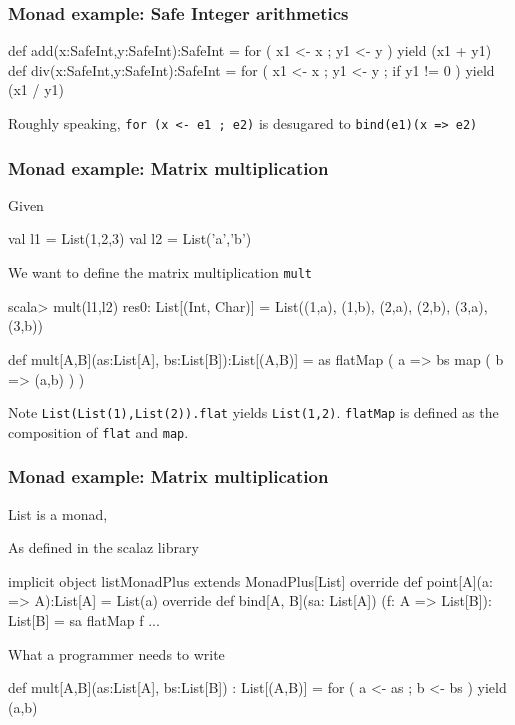 \documentclass{beamer}
\newcommand{\beb}{\begin{exampleblock}}
\newcommand{\eeb}{\end{exampleblock}}
\begin{document}
\begin{frame}[fragile]
\frametitle{Monad example: Safe Integer arithmetics}
\beb{}
\begin{code}
def add(x:SafeInt,y:SafeInt):SafeInt = {
  for ( x1 <- x
  ; y1 <- y
  ) yield (x1 + y1)
}
def div(x:SafeInt,y:SafeInt):SafeInt = {
  for ( x1 <- x
  ; y1 <- y
  ; if y1 != 0
  ) yield (x1 / y1)
}
\end{code}
\eeb{}
Roughly speaking, {\tt for (x <- e1 ; e2)} is desugared to 
{\tt bind(e1)(x => e2)}
\end{frame}



\begin{frame}[fragile]
\frametitle{Monad example: Matrix multiplication}
Given
\beb{}
\begin{code}
val l1 = List(1,2,3)
val l2 = List('a','b')
\end{code}
\eeb
We want to define the matrix multiplication {\tt mult} 
\begin{code}
scala> mult(l1,l2)
res0: List[(Int, Char)] = List((1,a), (1,b), (2,a), (2,b),
 (3,a),(3,b))
\end{code}
\beb{}
\begin{code}
def mult[A,B](as:List[A], bs:List[B]):List[(A,B)] = {
  as flatMap ( a => 
  bs map ( b => (a,b) )
  )
}
\end{code}
\eeb{}
Note {\tt List(List(1),List(2)).flat} yields {\tt List(1,2)}. {\tt flatMap}
is defined as the composition of {\tt flat} and {\tt map}.
\end{frame}


\begin{frame}[fragile]
\frametitle{Monad example: Matrix multiplication}
List is a monad,
\beb{As defined in the scalaz library}
\begin{code}
implicit object listMonadPlus extends MonadPlus[List] {
  override def point[A](a: => A):List[A] = List(a)
  override def bind[A, B](sa: List[A])
     (f: A => List[B]): List[B] = sa flatMap f
...
}
\end{code}
\eeb
\beb{What a programmer needs to write}
\begin{code}
def mult[A,B](as:List[A], bs:List[B]) : List[(A,B)] = for 
  ( a <- as
  ; b <- bs
  ) yield (a,b)
\end{code}
\eeb{}
\end{frame}
\end{document}
